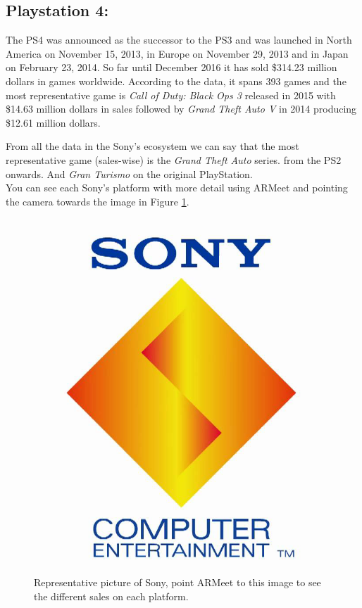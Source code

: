 \subsection{Playstation 4:} The PS4 was announced as the successor to the
PS3 and was launched in North America on November 15, 2013, in Europe on
November 29, 2013 and in Japan on February 23, 2014\cite{Sony}. So far until
December 2016 it has sold \$314.23 million dollars in games
worldwide. According to the data, it spans 393 games and the most
representative game is \textit{Call of Duty: Black Ops 3} released in 2015
with \$14.63 million dollars in sales followed by \textit{Grand Theft Auto V}
in 2014 producing \$12.61 million dollars.\newpage

From all the data in the Sony's ecosystem we can say that the most
representative game (sales-wise) is the \textit{Grand Theft Auto}
series. from the PS2 onwards. And \textit{Gran Turismo} on the original
PlayStation.\\
You can see each Sony's platform with more detail using ARMeet and pointing
the camera towards the image in Figure \ref{fig:SonyImage}.


\begin{figure}[h]
  \centering
  \centerline{\includegraphics[scale=0.3]{images/SonyMainTarget.png}}
  \caption{Representative picture of Sony, point ARMeet to this image to
    see the different sales on each platform.}
  \label{fig:SonyImage}
\end{figure}

